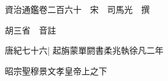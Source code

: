 






























































資治通鑑卷二百六十　宋　司馬光　撰

胡三省　音註

唐紀七十六|{
	起旃蒙單閼書柔兆執徐凡二年}


昭宗聖穆景文孝皇帝上之下

